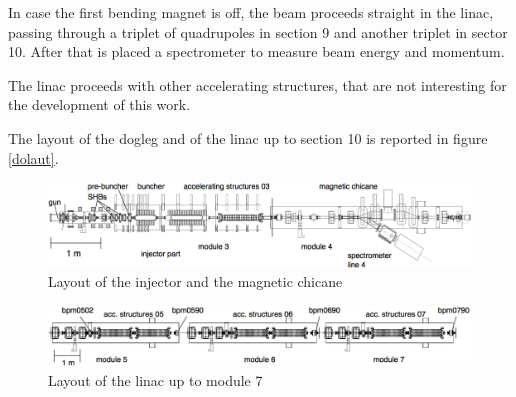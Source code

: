 In case the first bending magnet is off, the beam proceeds straight in the linac, passing through a triplet of quadrupoles in section 9 and another triplet in sector 10. After that is placed a spectrometer to measure beam energy and momentum. 

The linac proceeds with other accelerating structures, that are not interesting for the development of this work.

The layout of the dogleg and of the linac up to section 10 is reported in figure \ref{dolaut}.


\begin{landscape}
\begin{center}

\begin{figure}
\centering 
\includegraphics[width=23cm,keepaspectratio]{pictures/Injector}
\caption{Layout of the injector and the magnetic chicane}
\label{injlayout}
\end{figure}

\vspace{20mm}

\begin{figure}
\centering 
\includegraphics[width=23cm,keepaspectratio]{pictures/girder5-7}
\caption{Layout of the linac up to module 7}
\label{linaclayout}
\end{figure}

\end{center}
\end{landscape}



